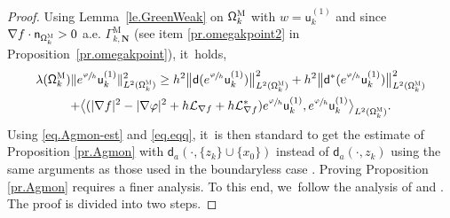 \documentclass[JEP,XML,SOM,Unicode,NoEqCountersInSection,NoFloatCountersInSection,published]{cedram}
\newcommand{\mbf}[1]{\mathbf{#1}}
\theoremstyle{plain}
\theoremstyle{definition}
\begin{document}
\begin{proof}
Using Lemma~\ref{le.GreenWeak} on $\mathsf \Omega_k^{\textsc{M}}$ with $w=\mathsf u^{(1)}_k$ and since $\nabla f \cdot \mathsf n_{\mathsf \Omega_k^{\textsc{M}} }> 0$ a.e. $\Gamma_{k, \mbf N}^{\text{M}}$ (see item \eqref{pr.omegakpoint2} in Proposition~\ref{pr.omegakpoint}), it~holds,
\begin{multline} \label{eq.Agmon-est}
\lambda(\mathsf \Omega_k^{\textsc{M}}) \Vert e^{\sfrac{\varphi}{h}} \mathsf u^{(1)}_k \Vert_{ L^{2} (\mathsf \Omega_k^{\textsc{M}})}^2\ge
h^{2}\big \| \mathsf d (e^{\sfrac{\varphi}{h}} \mathsf u^{(1)}_k)\big \|^{2}_{ L^{2} (\mathsf \Omega_k^{\textsc{M}})}+
h^{2} \big \| \mathsf d^{*} (e^{\sfrac{\varphi}{h}} \mathsf u^{(1)}_k) \big \|^{2}_{ L^{2} (\mathsf \Omega_k^{\textsc{M}})}\\
+ \big \langle
(|\nabla f|^{2}-|\nabla \varphi|^{2}+h\mathcal{L}_{\nabla
f}+h\mathcal{L}_{\nabla
f}^{*})e^{\sfrac{\varphi}{h}} \mathsf u^{(1)}_k, e^{\sfrac{\varphi}{h}}
\mathsf u^{(1)}_k\big \rangle_{ L^{2} (\mathsf \Omega_k^{\textsc{M}})}.
\end{multline}
Using \eqref{eq.Agmon-est} and \eqref{eq.eqq}, it~is then standard to get the estimate of Proposition \ref{pr.Agmon} with $\mathsf d_a(\cdot,\{z_k\}\cup \{x_0\})$ instead of $\mathsf d_a(\cdot,z_k)$ using the same arguments as those used in the boundaryless case \cite[Prop.\,3.3.1]{helffer-88}. Proving Proposition \ref{pr.Agmon} requires a finer analysis. To this end, we~follow the analysis of \cite[\S2.2]{HelSjII} and \cite[\S6.c]{DiSj}.
The proof is divided into two steps.


\end{proof}
\end{document}
